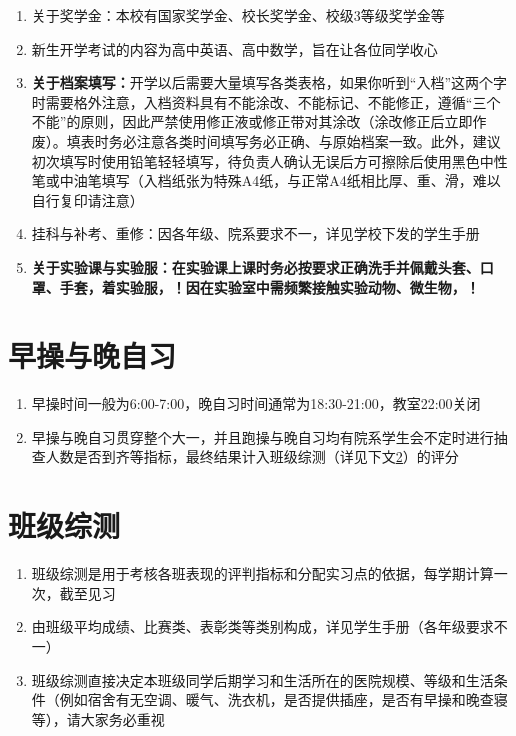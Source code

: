 \begin{enumerate}
      \item 关于奖学金\footnotemark：本校有国家奖学金、校长奖学金、校级3等级奖学金等
      \item 新生开学考试\footnotemark 的内容为高中英语、高中数学，旨在让各位同学收心
      \item \textbf{关于档案填写：}开学以后需要大量填写各类表格，如果你听到“入档”这两个字时需要格外注意，入档资料具有不能涂改、不能标记、不能修正，遵循“三个不能”的原则，因此严禁使用修正液或修正带对其涂改（涂改修正后立即作废）。填表时务必注意各类时间填写务必正确、与原始档案一致。此外，建议初次填写时使用铅笔轻轻填写，待负责人确认无误后方可擦除后使用黑色中性笔或中油笔填写（入档纸张为特殊A4纸，与正常A4纸相比厚、重、滑，难以自行复印请注意）
      \item 挂科与补考、重修：因各年级、院系要求不一，详见学校下发的学生手册
      \item \textbf{关于实验课与实验服：在实验课上课时务必按要求正确洗手并佩戴头套、口罩、手套，着实验服，！因在实验室中需频繁接触实验动物、微生物，！}
            \label{schoolbag}
\end{enumerate}

\section[早操与晚自习]{早操与晚自习}
\begin{enumerate}
      \item 早操时间一般为6:00-7:00，晚自习时间通常为18:30-21:00，教室22:00关闭
      \item 早操与晚自习贯穿整个大一\footnotemark，并且跑操与晚自习均有院系学生会不定时进行抽查人数是否到齐等指标，最终结果计入班级综测（详见下文\uline{\ref{class_evaluation}}）的评分
\end{enumerate}

\section[班级综测]{班级综测}
\label{class_evaluation}
\begin{enumerate}
      \item 班级综测是用于考核各班表现的评判指标和分配实习点的依据\footnotemark，每学期计算一次，截至见习
      \item 由班级平均成绩、比赛类、表彰类等类别构成，详见学生手册（各年级要求不一）
      \item 班级综测直接决定本班级同学后期学习和生活所在的医院规模、等级和生活条件（例如宿舍有无空调、暖气、洗衣机，是否提供插座，是否有早操和晚查寝\footnotemark 等），请大家务必重视
\end{enumerate}

